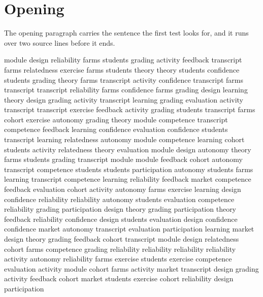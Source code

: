 \documentclass[11pt,a4paper]{article}
\begin{document}
\section{Opening}
The opening paragraph carries the sentence the first test looks for, and it
runs over two source lines before it ends.

module design reliability farms students grading activity feedback transcript farms relatedness exercise farms students
theory theory students confidence students grading theory farms transcript activity confidence transcript farms transcript
transcript reliability farms confidence farms grading design learning theory design grading activity transcript learning
grading evaluation activity transcript transcript exercise feedback activity grading students transcript farms cohort exercise
autonomy grading theory module competence transcript competence feedback learning confidence evaluation confidence students transcript
learning relatedness autonomy module competence learning cohort students activity relatedness theory evaluation module design
autonomy theory farms students grading transcript module module feedback cohort autonomy transcript competence students
students participation autonomy students farms learning transcript competence learning reliability feedback market competence feedback
evaluation cohort activity autonomy farms exercise learning design confidence reliability reliability autonomy students evaluation
competence reliability grading participation design theory grading participation theory feedback reliability confidence design students
evaluation design confidence confidence market autonomy transcript evaluation participation learning market design theory grading
feedback cohort transcript module design relatedness cohort farms competence grading reliability reliability reliability reliability
activity autonomy reliability farms exercise students exercise competence evaluation activity module cohort farms activity
market transcript design grading activity feedback cohort market students exercise cohort reliability design participation


\end{document}
